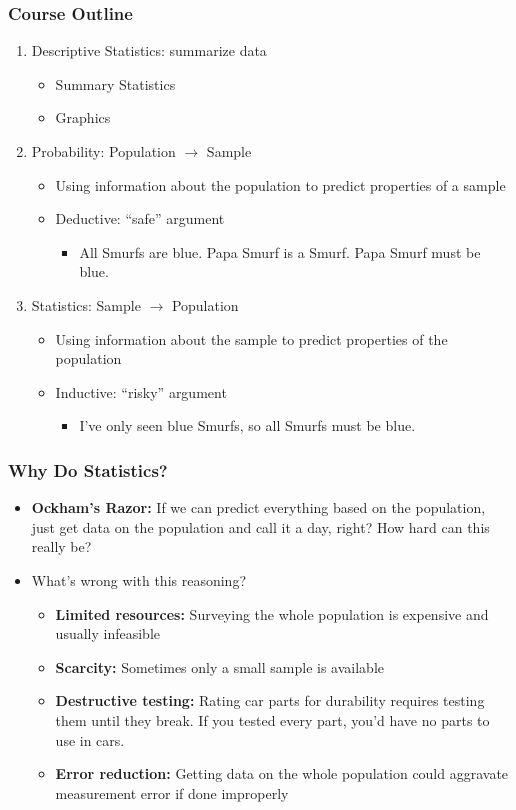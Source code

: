 \documentclass[handout]{beamer}
\begin{document}
\begin{frame}
\frametitle{Course Outline}
	\begin{enumerate}
		\item Descriptive Statistics: summarize data
			\begin{itemize}
				\item Summary Statistics
				\item Graphics
			\end{itemize}
		\item Probability: Population $\rightarrow$ Sample
			\begin{itemize}
				\item Using information about the population to predict properties of a sample
				\item Deductive: ``safe'' argument
					\begin{itemize}
						\item All Smurfs are blue. Papa Smurf is a Smurf. Papa Smurf must be blue.
					\end{itemize}
			\end{itemize}
		\item Statistics: Sample $\rightarrow$ Population
			\begin{itemize}
				\item Using information about the sample to predict properties of the population
				\item Inductive: ``risky'' argument
					\begin{itemize}
						\item I've only seen blue Smurfs, so all Smurfs must be blue.
					\end{itemize}
			 \end{itemize}
	\end{enumerate}
\end{frame}

\begin{frame}
\frametitle{Why Do Statistics?}
	\begin{itemize}[<+- | alert@+>]
		\item \textbf{Ockham's Razor:} If we can predict everything based on the population, just 			get data on the population and call it a day, right? How hard can this really be?
		\item What's wrong with this reasoning?
		\begin{itemize}[<+- | alert@+>]
			\item \textbf{Limited resources:} Surveying the whole population is expensive and 					usually infeasible
			\item \textbf{Scarcity:} Sometimes only a small sample is available
			\item \textbf{Destructive testing:} Rating car parts for durability requires testing them 				until they break. If you tested every part, you'd have no parts to use in cars.
			\item \textbf{Error reduction:} Getting data on the whole population could aggravate 				measurement error if done improperly
		\end{itemize}
	\end{itemize}	
\end{frame}
\end{document}
